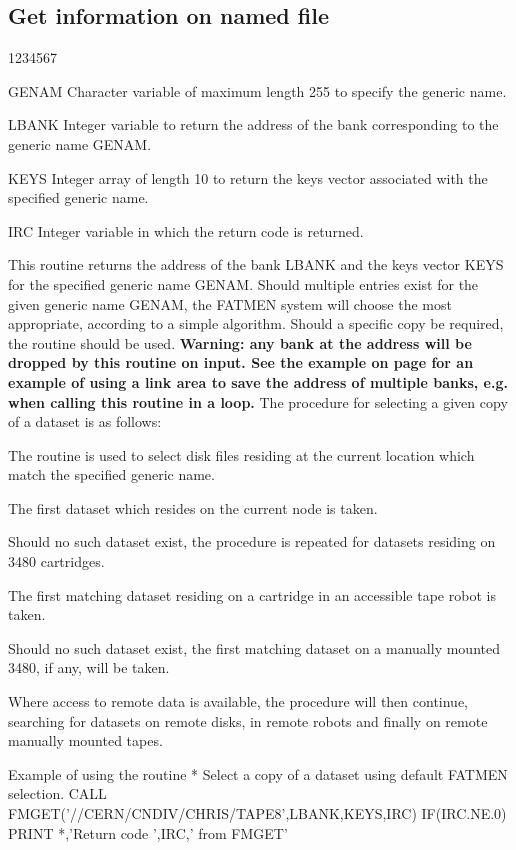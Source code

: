 \subsection{Get information on named file}
\begin{DLtt}{1234567}
\item[GENAM]
Character variable of maximum length 255 to specify the generic name.
\item[LBANK]
Integer variable to return the address of the bank corresponding
to the generic name GENAM.
\item[KEYS]
Integer array of length 10 to return the keys vector associated
with the specified generic name.
\item[IRC]
Integer variable in which the return code is returned.
\end{DLtt}
\par
This routine returns the address of the bank LBANK
and the keys vector KEYS
for the specified generic name GENAM. Should multiple entries exist for
the given generic name GENAM, the FATMEN system will choose the most
appropriate, according to a simple algorithm. Should a specific
copy be required, the routine  should be used.
{\bf Warning: any bank at the address  will be dropped by this
routine on input.
See the example on page
\pageref{LAREA} for an example of using a link area
to save the address of multiple banks, e.g. when calling this
routine in a loop.}
The procedure for selecting a given copy of a dataset is as follows:

\begin{UL}
\item
The routine  is used to select disk files residing at the current
location which match the specified generic name.
\item
The first dataset which resides on the current node is taken.
\item
Should no such dataset exist, the procedure is repeated for datasets
residing on 3480 cartridges.
\item
The first matching dataset residing on a cartridge in an accessible
tape robot is taken.
\item
Should no such dataset exist, the first matching dataset on
a manually mounted 3480, if any, will be taken.
\end{UL}

Where access to remote data is available, the procedure will then
continue, searching for datasets on remote disks, in remote
robots and finally on remote manually mounted tapes.
\begin{XMPt}{Example of using the \protect{} routine}
*     Select a copy of a dataset using default FATMEN selection.
      CALL FMGET('//CERN/CNDIV/CHRIS/TAPE8',LBANK,KEYS,IRC)
      IF(IRC.NE.0) PRINT *,'Return code ',IRC,' from FMGET'
\end{XMPt}
